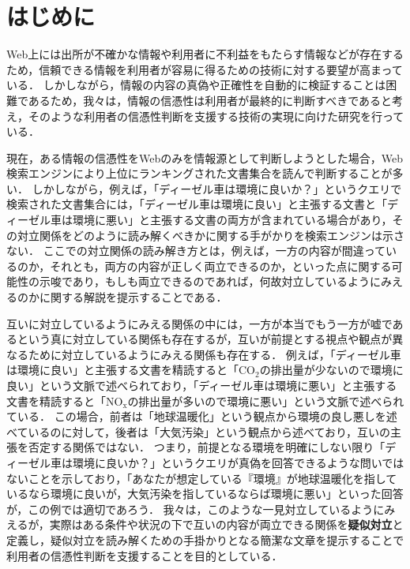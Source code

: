 \documentclass[japanese]{jnlp_1.4}
\begin{document}
\maketitle


\section{はじめに}\label{sc:introduction}

Web上には出所が不確かな情報や利用者に不利益をもたらす情報などが存在するため，信頼できる情報を利用者が容易に得るための技術に対する要望が高まっている．
しかしながら，情報の内容の真偽や正確性を自動的に検証することは困難であるため，我々は，情報の信憑性は利用者が最終的に判断すべきであると考え，そのような利用者の信憑性判断を支援する技術の実現に向けた研究を行っている．

現在，ある情報の信憑性をWebのみを情報源として判断しようとした場合，Web検索エンジンにより上位にランキングされた文書集合を読んで判断することが多い．
しかしながら，例えば，「ディーゼル車は環境に良いか？」というクエリで検索された文書集合には，「ディーゼル車は環境に良い」と主張する文書と「ディーゼル車は環境に悪い」と主張する文書の両方が含まれている場合があり，その対立関係をどのように読み解くべきかに関する手がかりを検索エンジンは示さない．
ここでの対立関係の読み解き方とは，例えば，一方の内容が間違っているのか，それとも，両方の内容が正しく両立できるのか，といった点に関する可能性の示唆であり，もしも両立できるのであれば，何故対立しているようにみえるのかに関する解説を提示することである．

互いに対立しているようにみえる関係の中には，一方が本当でもう一方が嘘であるという真に対立している関係も存在するが，互いが前提とする視点や観点が異なるために対立しているようにみえる関係も存在する．
例えば，「ディーゼル車は環境に良い」と主張する文書を精読すると「$\mathrm{CO_2}$の排出量が少ないので環境に良い」という文脈で述べられており，「ディーゼル車は環境に悪い」と主張する文書を精読すると「$\mathrm{NO_x}$の排出量が多いので環境に悪い」という文脈で述べられている．
この場合，前者は「地球温暖化」という観点から環境の良し悪しを述べているのに対して，後者は「大気汚染」という観点から述べており，互いの主張を否定する関係ではない．
つまり，前提となる環境を明確にしない限り「ディーゼル車は環境に良いか？」というクエリが真偽を回答できるような問いではないことを示しており，「あなたが想定している『環境』が地球温暖化を指しているなら環境に良いが，大気汚染を指しているならば環境に悪い」といった回答が，この例では適切であろう．
我々は，このような一見対立しているようにみえるが，実際はある条件や状況の下で互いの内容が両立できる関係を{\bf 疑似対立}と定義し，疑似対立を読み解くための手掛かりとなる簡潔な文章を提示することで利用者の信憑性判断を支援することを目的としている．
\end{document}
